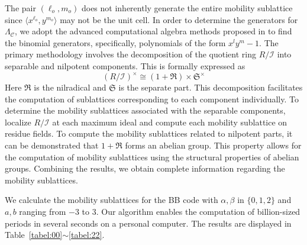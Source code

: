 \documentclass[aps,prl,english,superscriptaddress,twocolumn,tightenlines,showpacs,longbibliography,floatfix,amsfonts]{revtex4-2}
\begin{document}
The pair $(\ell_o,m_o)$ does not inherently generate the entire mobility sublattice since $\langle x^{\ell_o}, y^{m_o}\rangle$ may not be the unit cell. In order to determine the generators for $\Lambda_{\mathscr{C}}$, we adopt the advanced computational algebra methods proposed in \cite{kreuzer24} to find the binomial generators, specifically, polynomials of the form $x^ly^m-1$. The primary methodology involves the decomposition of the quotient ring $R/\mathcal{I}$ into separable and nilpotent components. This is formally expressed as
\begin{equation}
	(R/\mathcal{I})^\times \cong (1+\mathfrak{R})\times \mathfrak{S}^\times 
\end{equation}
Here $\mathfrak{R}$ is the nilradical and $\mathfrak{S}$ is the separate part. This decomposition facilitates the computation of sublattices corresponding to each component individually.  To determine the mobility sublattices associated with the separable components, localize $R/\mathcal{I}$ at each maximum ideal and compute each mobility sublattice on residue fields. To compute the mobility sublattices related to nilpotent parts, it can be demonstrated that $1+\mathfrak{R}$  forms an abelian group. This property allows for the computation of mobility sublattices using the structural properties of abelian groups.  Combining the results, we obtain complete information regarding the mobility sublattices.

We calculate the mobility sublattices for the BB code with $\alpha, \beta$ in $\{0,1,2\}$ and $a, b$ ranging from $-3$ to $3$. Our algorithm enables the computation of billion-sized periods in several seconds on a personal computer. The results are displayed in Table~\ref{tabel:00}$\sim$\ref{tabel:22}.
\end{document}
